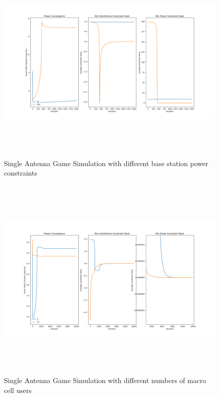\documentclass[12pt,a4paper]{report}
\begin{document}
\begin{figure}[H]
	\includegraphics[width= 15cm,height = 10cm]{figures/single_power}
	  \caption{Single Antenna Game Simulation with different base station power constraints}
\end{figure}

\begin{figure}[H]
	\includegraphics[width= 15cm,height = 10cm]{figures/single_macro}
	  \caption{Single Antenna Game Simulation with different numbers of macro cell users}
\end{figure}
\end{document}
